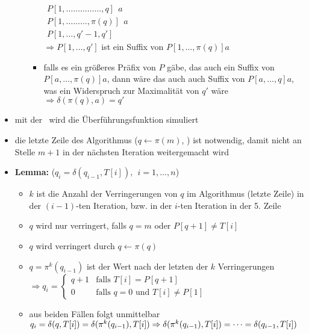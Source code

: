 \begin{itemize}[itemsep=-2pt]
\begin{enumerate}
\begin{itemize}
						$\begin{array}{r}
							P[1,\dots\dots\dots\dots\dots,q]~~a\\
							P[1,\dots\dots\dots,\pi(q)]~~a\\
							P[1,\dots,q'-1,q']
						\end{array}$\\
						$\Rightarrow P[1,\dots,q']$ ist ein Suffix von $P[1,\dots,\pi(q)]a$
						\item falls es ein größeres Präfix von $P$ gäbe, das auch ein Suffix von $P[a,\dots,\pi(q)]a$, dann wäre das auch auch Suffix von $P[a,\dots,q]a$, was ein Widerspruch zur Maximalität von $q'$ wäre\\
						$\Rightarrow \delta(\pi(q),a)=q'$
					\end{itemize}
		\end{enumerate}
	\item mit der \bound~wird die Überführungsfunktion simuliert
	\item die letzte Zeile des Algorithmus ($q\leftarrow\pi(m)$, ) ist notwendig, damit nicht an Stelle $m+1$ in der nächsten Iteration weitergemacht wird
	\item \textbf{Lemma:} ($q_i=\delta(q_{i-1},T[i]),~~i=1,\dots,n$)
		\vspace*{-1.5\baselineskip}\Proof\up
			\begin{itemize}[itemsep=0pt]
				\item $k$ ist die Anzahl der Verringerungen von $q$ im Algorithmus (letzte Zeile) in der $(i-1)$-ten Iteration, bzw. in der $i$-ten Iteration in der 5. Zeile
				\item $q$ wird nur verringert, falls $q=m$ oder $P[q+1]\neq T[i]$
				\item $q$ wird verringert durch $q \leftarrow \pi(q)$
				\item $q=\pi^k(q_{i-1})$ ist der Wert nach der letzten der $k$ Verringerungen\\
				$\Rightarrow q_i=\left\{\begin{array}{cl}
					q+1 & \text{falls }T[i]=P[q+1]\\
					0&\text{falls }q=0\text{ und }T[i]\neq P[1]
				\end{array}\right.$
				\item aus beiden Fällen folgt unmittelbar $q_i=\delta(q,T[i])=\delta(\pi^k(q_{i-1}),T[i])\\
				\Rightarrow \delta(\pi^k(q_{i-1}),T[i])=\dots=\delta(q_{i-1},T[i])$
			\end{itemize}

\end{itemize}
